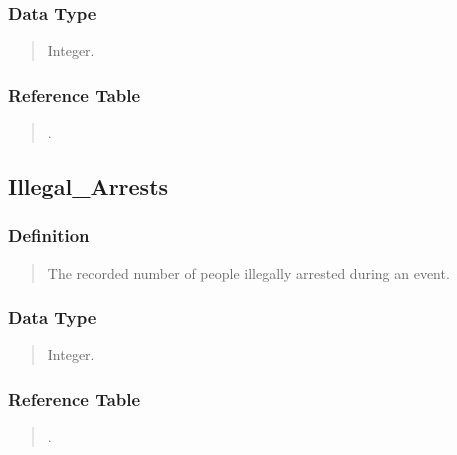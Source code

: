 \documentclass[letterpaper,10pt,english]{sphinxmanual}
\begin{document}
\subsubsection{Data Type}
\label{\detokenize{schema_tables:id56}}\begin{quote}

\sphinxAtStartPar
Integer.
\end{quote}


\subsubsection{Reference Table}
\label{\detokenize{schema_tables:id57}}\begin{quote}

\sphinxAtStartPar
{\hyperref[\detokenize{schema_tables:overview-table}]{}}.
\end{quote}


\subsection{Illegal\_Arrests}
\label{\detokenize{schema_tables:illegal-arrests}}

\subsubsection{Definition}
\label{\detokenize{schema_tables:id58}}\begin{quote}

\sphinxAtStartPar
The recorded number of people illegally arrested during an event.
\end{quote}


\subsubsection{Data Type}
\label{\detokenize{schema_tables:id59}}\begin{quote}

\sphinxAtStartPar
Integer.
\end{quote}


\subsubsection{Reference Table}
\label{\detokenize{schema_tables:id60}}\begin{quote}

\sphinxAtStartPar
{\hyperref[\detokenize{schema_tables:overview-table}]{}}.
\end{quote}
\end{document}
